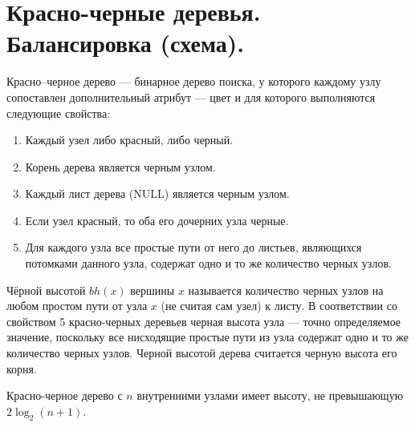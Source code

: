 \section{Красно-черные деревья. Балансировка (схема).}

\begin{definition}
    Красно–черное дерево --- бинарное дерево поиска, у которого каждому узлу сопоставлен дополнительный атрибут --- цвет и для которого выполняются следующие свойства:

    \begin{enumerate}
        \item Каждый узел либо красный, либо черный.
        \item Корень дерева является черным узлом.
        \item Каждый лист дерева (NULL) является черным узлом.
        \item Если узел красный, то оба его дочерних узла черные.
        \item Для каждого узла все простые пути от него до листьев, являющихся потомками данного узла, содержат одно и то же количество черных узлов.
    \end{enumerate}
\end{definition}


\begin{definition}
    Чёрной высотой $bh(x)$ вершины $x$ называется количество черных узлов на любом простом пути от узла $x$ (не считая сам узел) к листу. В соответствии со свойством 5 красно-черных деревьев черная высота узла --- точно определяемое значение, поскольку все нисходящие простые пути из узла содержат одно и то же количество черных узлов.
    Черной высотой дерева считается черную высота его корня.
\end{definition}

\begin{lemma}
Красно-черное дерево с $n$ внутренними узлами имеет высоту, не превышающую $2 \log_2(n + 1)$.
\end{lemma}

